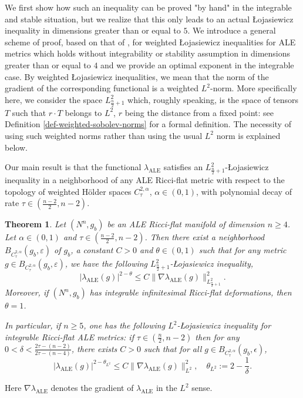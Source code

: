 \documentclass[a4paper,11pt,reqno]{amsart}
\newtheorem{theo}[defn]{Theorem}
\numberwithin{equation}{section}
\begin{document}
	We first show how such an inequality can be proved "by hand" in the integrable and stable situation, but we realize that this only leads to an actual \L{}ojasiewicz inequality in dimensions greater than or equal to $5$. We introduce a general scheme of proof, based on that of \cite{Col-Min-Ein-Tan-Con}, for weighted \L{}ojasiewicz inequalities for ALE metrics which holds without integrability or stability assumption in dimensions greater than or equal to $4$ and we provide an optimal exponent in the integrable case. By weighted \L{}ojasiewicz inequalities, we mean that the norm of the gradient of the corresponding functional is a weighted $L^2$-norm. More specifically here, we consider the space $L^2_{\frac{n}{2}+1}$ which, roughly speaking, is the space of tensors $T$ such that $r\cdot T$ belongs to $L^2$, $r$ being the distance from a fixed point: see Definition \ref{def-weighted-sobolev-norms} for a formal definition. The necessity of using such weighted norms rather than using the usual $L^2$ norm is explained below. 
	
Our main result is that the functional $\lambda_{\operatorname{ALE}}$ satisfies an $L^2_{\frac{n}{2}+1}$-\L ojasiewicz inequality in a neighborhood of any ALE Ricci-flat metric with respect to the topology of weighted H\"older spaces $C^{2,\alpha}_{\tau}$, $\alpha\in(0,1)$, with polynomial decay of rate $\tau\in (\frac{n-2}{2},n-2)$. 
	\begin{theo}\label{dream-thm-loja-intro}
		Let $(N^n,g_b)$ be an ALE Ricci-flat manifold of dimension $n\geq 4$. Let $\alpha\in(0,1)$ and $\tau\in(\frac{n-2}{2},n-2)$. Then there exist a neighborhood $B_{C^{2,\alpha}_{\tau}}(g_b,\varepsilon)$ of $g_b$, a constant $C>0$ and $\theta\in (0,1)$ such that for any metric $g\in B_{C^{2,\alpha}_{\tau}}(g_b,\varepsilon)$, we have the following $L^2_{\frac{n}{2}+1}$-\L ojasiewicz inequality,
		\begin{equation}
		|\lambda_{\operatorname{ALE}}(g)|^{2-\theta}\leq C\|\nabla \lambda_{\operatorname{ALE}}(g)\|_{L^2_{\frac{n}{2}+1}}^{2}.\label{loj-ineq-lambda-ALE}
		\end{equation}
		Moreover, if $(N^n,g_b)$ has integrable infinitesimal Ricci-flat deformations, then $\theta=1$.
		
		In particular, if $n\geq 5$, one has the following $L^2$-\L ojasiewicz inequality for integrable Ricci-flat ALE metrics: if $\tau\in(\frac{n}{2},n-2)$ then for any $0<\delta<\frac{2\tau-(n-2)}{2\tau-(n-4)}$, there exists $C>0$ such that for all $g\in B_{C^{2,\alpha}_\tau}(g_b,\epsilon)$, 
				$$ |\lambda_{\operatorname{ALE}}(g)|^{2-\theta_{L^2}}\leq C \|\nabla \lambda_{\operatorname{ALE}}(g)\|_{L^2}^{2}, \quad\theta_{L^2}:=2-\frac{1}{\delta}.$$

		
	\end{theo}
	Here $\nabla \lambda_{\operatorname{ALE}}$ denotes the gradient of $\lambda_{\operatorname{ALE}}$ in the $L^2$ sense.
	
\end{document}
